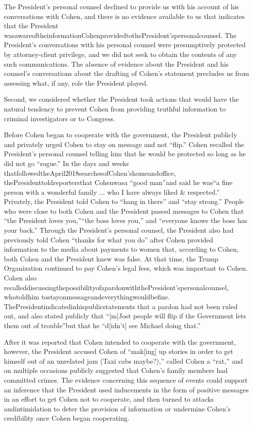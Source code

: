 {The President's personal counsel declined to provide us with his account of his conversations with Cohen, and there is no evidence available to us that indicates that the President wasawareoftheinformationCohenprovidedtothePresident'spersonalcounsel. The President's conversations with his personal counsel were presumptively protected by attorney-client privilege, and we did not seek to obtain the contents of any such communications. The absence of evidence about the President and his counsel's conversations about the drafting of Cohen's statement precludes us from assessing what, if any, role the President played.

Second, we considered whether the President took actions that would have the natural tendency to prevent Cohen from providing truthful information to criminal investigators or to Congress.

Before Cohen began to cooperate with the government, the President publicly and privately urged Cohen to stay on message and not “flip.” Cohen recalled the President's personal counsel telling him that he would be protected so long as he did not go “rogue.” In the days and weeks thatfollowedtheApril2018searchesofCohen'shomeandoffice, thePresidenttoldreportersthat Cohenwasa “good man”and said he was“a fine person with a wonderful family ... who I have always liked & respected.” Privately, the President told Cohen to “hang in there” and “stay strong.” People who were close to both Cohen and the President passed messages to Cohen that “the President loves you,”“the boss loves you,” and “everyone knows the boss has your back.” Through the President's personal counsel, the President also had previously told Cohen “thanks for what you do” after Cohen provided information to the media about payments to women that, according to Cohen, both Cohen and the President knew was false. At that time, the Trump Organization continued to pay Cohen's legal fees, which was important to Cohen. Cohen also recalleddiscussingthepossibilityofapardonwiththePresident'spersonalcounsel, whotoldhim tostayonmessageandeverythingwouldbefine. ThePresidentindicatedinhispublicstatements that a pardon had not been ruled out, and also stated publicly that “[m]Jost people will flip if the Government lets them out of trouble”but that he “d[idn't] see Michael doing that.”

After it was reported that Cohen intended to cooperate with the government, however, the President accused Cohen of “mak[ing] up stories in order to get himself out of an unrelated jam (Taxi cabs maybe?),” called Cohen a “rat,” and on multiple occasions publicly suggested that Cohen's family members had committed crimes. The evidence concerning this sequence of events could support an inference that the President used inducements in the form of positive messages in an effort to get Cohen not to cooperate, and then turned to attacks andintimidation to deter the provision of information or undermine Cohen's credibility once Cohen began cooperating.

}
